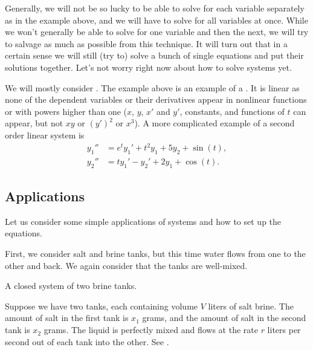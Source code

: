 Generally, we will not be so lucky to be able to solve for
each variable separately as in the 
example above, and we will have to solve for all variables at once.
While we won't generally be able to solve for one variable and then the
next, we will try to salvage as much as possible from this technique.
It will turn out that in a certain sense we will still (try to) solve
a bunch of single equations and put their solutions together.  Let's not
worry right now about how to solve systems yet.

We will mostly consider \emph{}.  The example
above is an example of a \emph{}.
It is linear as none of the dependent variables or their derivatives
appear in nonlinear functions or with powers
higher than one ($x$, $y$, $x'$ and $y'$, constants, and functions of $t$
can appear, but not $xy$ or ${(y')}^2$ or $x^3$).  A more
complicated example of a second order linear system is
\begin{align*}
y_1'' &= e^t y_1' + t^2 y_1 + 5 y_2 + \sin(t), \\
y_2'' &= t y_1'-y_2' + 2 y_1 + \cos(t).
\end{align*}

\subsection{Applications}

Let us consider some simple applications of systems and how to set up the
equations.

\begin{example} \label{sintro:closedbrine-example}
First, we consider salt and brine tanks, but this time water flows
from one to the other and back.  We again consider that the tanks are
well-mixed.

\begin{myfig}
\capstart
{}
\caption{A closed system of two brine tanks.\label{sintro:closedbrine}}
\end{myfig}

Suppose we have two tanks, each containing volume $V$ liters of salt brine.
The amount of salt in the first tank is $x_1$ grams, and the amount of salt
in the second tank is $x_2$ grams.  The liquid is perfectly mixed and
flows at the rate $r$ liters per second out of each tank into the other.
See . 
\end{example}

